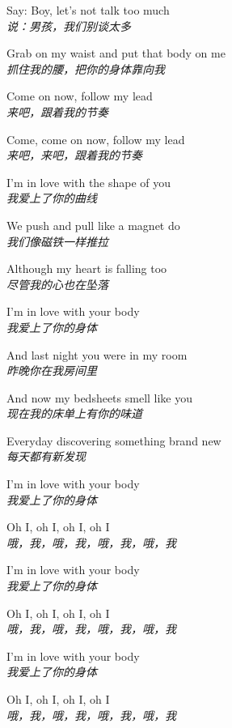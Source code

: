 \begin{spacing}{1.5}
\begin{flushleft}
Say: Boy, let's not talk too much\\
\textit{说：男孩，我们别谈太多}\lyricspace

Grab on my waist and put that body on me\\
\textit{抓住我的腰，把你的身体靠向我}\lyricspace

Come on now, follow my lead\\
\textit{来吧，跟着我的节奏}\lyricspace

Come, come on now, follow my lead\\
\textit{来吧，来吧，跟着我的节奏}\lyricspace

I'm in love with the shape of you\\
\textit{我爱上了你的曲线}\lyricspace

We push and pull like a magnet do\\
\textit{我们像磁铁一样推拉}\lyricspace

Although my heart is falling too\\
\textit{尽管我的心也在坠落}\lyricspace

I'm in love with your body\\
\textit{我爱上了你的身体}\lyricspace

And last night you were in my room\\
\textit{昨晚你在我房间里}\lyricspace

And now my bedsheets smell like you\\
\textit{现在我的床单上有你的味道}\lyricspace

Everyday discovering something brand new\\
\textit{每天都有新发现}\lyricspace

I'm in love with your body\\
\textit{我爱上了你的身体}\lyricspace

Oh I, oh I, oh I, oh I\\
\textit{哦，我，哦，我，哦，我，哦，我}\lyricspace

I'm in love with your body\\
\textit{我爱上了你的身体}\lyricspace

Oh I, oh I, oh I, oh I\\
\textit{哦，我，哦，我，哦，我，哦，我}\lyricspace

I'm in love with your body\\
\textit{我爱上了你的身体}\lyricspace

Oh I, oh I, oh I, oh I\\
\textit{哦，我，哦，我，哦，我，哦，我}\lyricspace


\end{flushleft}
\end{spacing}
